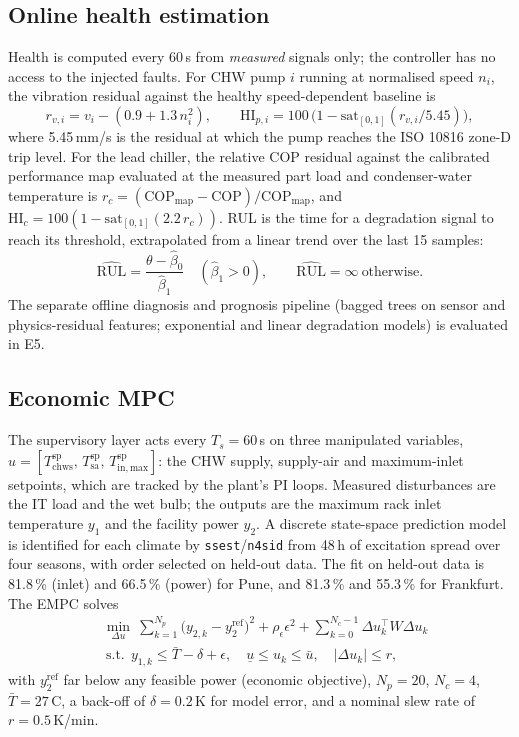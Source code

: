 \documentclass[preprint,12pt,authoryear]{elsarticle}
\begin{document}
\subsection{Online health estimation}
Health is computed every 60\,s from \emph{measured} signals only; the controller has no access to the injected faults. For CHW pump $i$ running at normalised speed $n_i$, the vibration residual against the healthy speed-dependent baseline is
\begin{equation}
r_{v,i}=v_i-(0.9+1.3\,n_i^2),\qquad \mathrm{HI}_{p,i}=100\,\bigl(1-\mathrm{sat}_{[0,1]}(r_{v,i}/5.45)\bigr),
\end{equation}
where 5.45\,mm/s is the residual at which the pump reaches the ISO 10816 zone-D trip level. For the lead chiller, the relative COP residual against the calibrated performance map evaluated at the measured part load and condenser-water temperature is $r_c=(\mathrm{COP}_{\mathrm{map}}-\mathrm{COP})/\mathrm{COP}_{\mathrm{map}}$, and $\mathrm{HI}_c=100(1-\mathrm{sat}_{[0,1]}(2.2\,r_c))$. RUL is the time for a degradation signal to reach its threshold, extrapolated from a linear trend over the last 15 samples:
\begin{equation}
\widehat{\mathrm{RUL}}=\frac{\theta-\hat\beta_0}{\hat\beta_1}\quad(\hat\beta_1>0),\qquad \widehat{\mathrm{RUL}}=\infty\ \text{otherwise}.
\end{equation}
The separate offline diagnosis and prognosis pipeline (bagged trees on sensor and physics-residual features; exponential and linear degradation models) is evaluated in E5.

\subsection{Economic MPC}
The supervisory layer acts every $T_s=60$\,s on three manipulated variables, $u=[T_{\mathrm{chws}}^{\mathrm{sp}},\,T_{\mathrm{sa}}^{\mathrm{sp}},\,T_{\mathrm{in,max}}^{\mathrm{sp}}]$: the CHW supply, supply-air and maximum-inlet setpoints, which are tracked by the plant's PI loops. Measured disturbances are the IT load and the wet bulb; the outputs are the maximum rack inlet temperature $y_1$ and the facility power $y_2$. A discrete state-space prediction model is identified for each climate by \texttt{ssest}/\texttt{n4sid} from 48\,h of excitation spread over four seasons, with order selected on held-out data. The fit on held-out data is 81.8\,\% (inlet) and 66.5\,\% (power) for Pune, and 81.3\,\% and 55.3\,\% for Frankfurt. The EMPC solves
\begin{equation}
\begin{aligned}
&\min_{\Delta u}\ \sum_{k=1}^{N_p}\bigl(y_{2,k}-y_2^{\mathrm{ref}}\bigr)^2+\rho_\epsilon\epsilon^2+\sum_{k=0}^{N_c-1}\Delta u_k^{\top}W\Delta u_k\\
&\ \text{s.t.}\ \ y_{1,k}\le \bar T-\delta+\epsilon,\quad \underline u\le u_k\le\bar u,\quad |\Delta u_k|\le r,
\end{aligned}
\end{equation}
with $y_2^{\mathrm{ref}}$ far below any feasible power (economic objective), $N_p=20$, $N_c=4$, $\bar T=27$\,\textdegree C, a back-off of $\delta=0.2$\,K for model error, and a nominal slew rate of $r=0.5$\,K/min.
\end{document}
